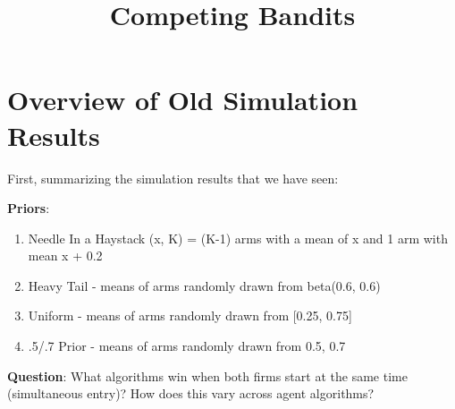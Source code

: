 \documentclass[11pt,letterpaper]{article}
\begin{document}
 

\title{Competing Bandits}
\maketitle

\section*{Overview of Old Simulation Results}

First, summarizing the simulation results that we have seen:

\textbf{Priors}:
\begin{enumerate}
\item Needle In a Haystack (x, K) = (K-1) arms with a mean of x and 1 arm with mean x + 0.2
\item Heavy Tail - means of arms randomly drawn from beta(0.6, 0.6)
\item Uniform - means of arms randomly drawn from [0.25, 0.75]
\item .5/.7 Prior - means of arms randomly drawn from {0.5, 0.7}
\end{enumerate}

\textbf{Question}: What algorithms win when both firms start at the same time (simultaneous entry)? How does this vary across agent algorithms?
\end{document}
